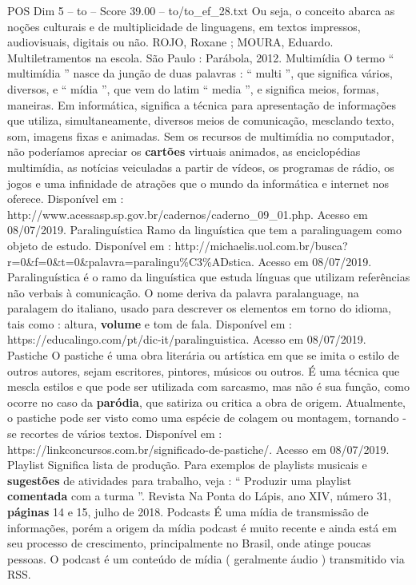 \begin{textsample}{POS Dim 5 – to – Score 39.00 – to/to\_ef\_28.txt}
Ou seja, o conceito abarca as noções culturais e de multiplicidade de linguagens, em textos impressos, audiovisuais, digitais ou não.
ROJO, Roxane ; MOURA, Eduardo.
Multiletramentos na escola.
São Paulo : Parábola, 2012.
Multimídia O termo “ multimídia ” nasce da junção de duas palavras : “ multi ”, que significa vários, diversos, e “ mídia ”, que vem do latim “ media ”, e significa meios, formas, maneiras.
Em informática, significa a técnica para apresentação de informações que utiliza, simultaneamente, diversos meios de comunicação, mesclando texto, som, imagens fixas e animadas.
Sem os recursos de multimídia no computador, não poderíamos apreciar os \textbf{cartões} virtuais animados, as enciclopédias multimídia, as notícias veiculadas a partir de vídeos, os programas de rádio, os jogos e uma infinidade de atrações que o mundo da informática e internet nos oferece.
Disponível em : http://www.acessasp.sp.gov.br/cadernos/caderno\_09\_01.php.
Acesso em 08/07/2019.
Paralinguística Ramo da linguística que tem a paralinguagem como objeto de estudo.
Disponível em : http://michaelis.uol.com.br/busca? r=0\&f=0\&t=0\&palavra=paralingu\%C3\%ADstica.
Acesso em 08/07/2019.
Paralinguística é o ramo da linguística que estuda línguas que utilizam referências não verbais à comunicação.
O nome deriva da palavra paralanguage, na paralagem do italiano, usado para descrever os elementos em torno do idioma, tais como : altura, \textbf{volume} e tom de fala.
Disponível em : https://educalingo.com/pt/dic-it/paralinguistica.
Acesso em 08/07/2019.
Pastiche O pastiche é uma obra literária ou artística em que se imita o estilo de outros autores, sejam escritores, pintores, músicos ou outros.
É uma técnica que mescla estilos e que pode ser utilizada com sarcasmo, mas não é sua função, como ocorre no caso da \textbf{paródia}, que satiriza ou critica a obra de origem.
Atualmente, o pastiche pode ser visto como uma espécie de colagem ou montagem, tornando -se recortes de vários textos.
Disponível em : https://linkconcursos.com.br/significado-de-pastiche/.
Acesso em 08/07/2019.
Playlist Significa lista de produção.
Para exemplos de playlists musicais e \textbf{sugestões} de atividades para trabalho, veja : “ Produzir uma playlist \textbf{comentada} com a turma ”.
Revista Na Ponta do Lápis, ano XIV, número 31, \textbf{páginas} 14 e 15, julho de 2018.
Podcasts É uma mídia de transmissão de informações, porém a origem da mídia podcast é muito recente e ainda está em seu processo de crescimento, principalmente no Brasil, onde atinge poucas pessoas.
O podcast é um conteúdo de mídia ( geralmente áudio ) transmitido via RSS.

\end{textsample}
